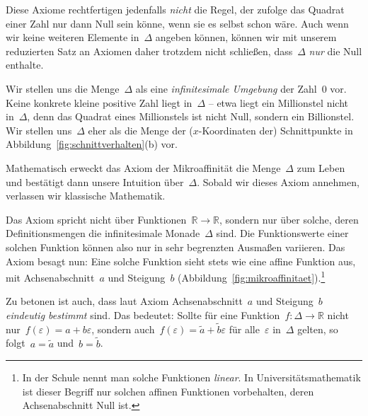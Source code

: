 \documentclass{zirkelblatt}
\newcommand{\RR}{\mathbb{R}}
\theoremstyle{definition}
\theoremstyle{plain}
\theoremstyle{remark}
\begin{document}
Diese Axiome rechtfertigen jedenfalls \emph{nicht} die Regel, der zufolge das
Quadrat einer Zahl nur dann Null sein könne, wenn sie es selbst schon wäre.
Auch wenn wir keine weiteren Elemente in~$\Delta$ angeben können, können wir
mit unserem reduzierten Satz an Axiomen daher trotzdem nicht schließen,
dass~$\Delta$ \emph{nur} die Null enthalte.

Wir stellen uns die Menge~$\Delta$ als eine \emph{infinitesimale Umgebung} der
Zahl~$0$ vor. Keine konkrete kleine positive Zahl liegt in~$\Delta$ -- etwa
liegt ein Millionstel nicht in~$\Delta$, denn das Quadrat eines Millionstels
ist nicht Null, sondern ein Billionstel. Wir stellen uns~$\Delta$ eher als die
Menge der ($x$-Koordinaten der) Schnittpunkte in Abbildung~\ref{fig:schnittverhalten}(b) vor.

Mathematisch erweckt das Axiom der Mikroaffinität die Menge~$\Delta$ zum Leben
und bestätigt dann unsere Intuition über~$\Delta$. Sobald wir dieses Axiom
annehmen, verlassen wir klassische Mathematik.

\textcolor{darkred}{\hspace{-5cm}}

\axiommikro

Das Axiom spricht nicht über Funktionen~$\RR \to \RR$, sondern nur
über solche, deren Definitionsmengen die infinitesimale Monade~$\Delta$ sind.
Die Funktionswerte einer solchen Funktion können also nur in sehr begrenzten
Ausmaßen variieren. Das Axiom besagt nun: Eine solche Funktion sieht stets wie
eine affine Funktion aus, mit Achsenabschnitt~$a$ und Steigung~$b$
(Abbildung~\ref{fig:mikroaffinitaet}).\footnote{In der Schule nennt man solche
Funktionen \emph{linear}. In Universitätsmathematik ist dieser Begriff nur
solchen affinen Funktionen vorbehalten, deren Achsenabschnitt Null ist.}

Zu betonen ist auch, dass laut Axiom Achsenabschnitt~$a$ und Steigung~$b$ \emph{eindeutig
bestimmt} sind. Das bedeutet: Sollte für eine Funktion~$f : \Delta \to \RR$
nicht nur~$f(\varepsilon) = a + b\varepsilon$, sondern auch~$f(\varepsilon) =
\tilde a + \tilde b \varepsilon$ für alle~$\varepsilon$ in~$\Delta$ gelten, so
folgt~$a = \tilde a$ und~$b = \tilde b$.
\end{document}
